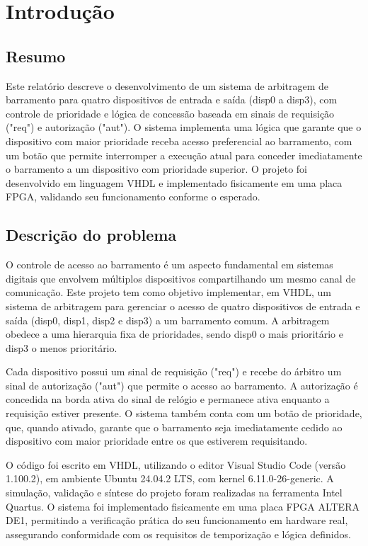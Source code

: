 \documentclass[oneside]{uffstex}
\begin{document}
\imprimircapa%

\tableofcontents*
\cleardoublepage%

\textual%
\chapter{Introdução}
\section{Resumo}
Este relatório descreve o desenvolvimento de um sistema de arbitragem de barramento para quatro dispositivos de entrada e saída (disp0 a disp3), com controle de prioridade e lógica de concessão baseada em sinais de requisição ("req") e autorização ("aut"). O sistema implementa uma lógica que garante que o dispositivo com maior prioridade receba acesso preferencial ao barramento, com um botão que permite interromper a execução atual para conceder imediatamente o barramento a um dispositivo com prioridade superior. O projeto foi desenvolvido em linguagem VHDL e implementado fisicamente em uma placa FPGA, validando seu funcionamento conforme o esperado.
\section{Descrição do problema}
O controle de acesso ao barramento é um aspecto fundamental em sistemas digitais que envolvem múltiplos dispositivos compartilhando um mesmo canal de comunicação. Este projeto tem como objetivo implementar, em VHDL, um sistema de arbitragem para gerenciar o acesso de quatro dispositivos de entrada e saída (disp0, disp1, disp2 e disp3) a um barramento comum. A arbitragem obedece a uma hierarquia fixa de prioridades, sendo disp0 o mais prioritário e disp3 o menos prioritário.

Cada dispositivo possui um sinal de requisição ("req") e recebe do árbitro um sinal de autorização ("aut") que permite o acesso ao barramento. A autorização é concedida na borda ativa do sinal de relógio e permanece ativa enquanto a requisição estiver presente. O sistema também conta com um botão de prioridade, que, quando ativado, garante que o barramento seja imediatamente cedido ao dispositivo com maior prioridade entre os que estiverem requisitando.

O código foi escrito em VHDL, utilizando o editor Visual Studio Code (versão 1.100.2), em ambiente Ubuntu 24.04.2 LTS, com kernel 6.11.0-26-generic. A simulação, validação e síntese do projeto foram realizadas na ferramenta Intel Quartus. O sistema foi implementado fisicamente em uma placa FPGA ALTERA DE1, permitindo a verificação prática do seu funcionamento em hardware real, assegurando conformidade com os requisitos de temporização e lógica definidos.
\end{document}
